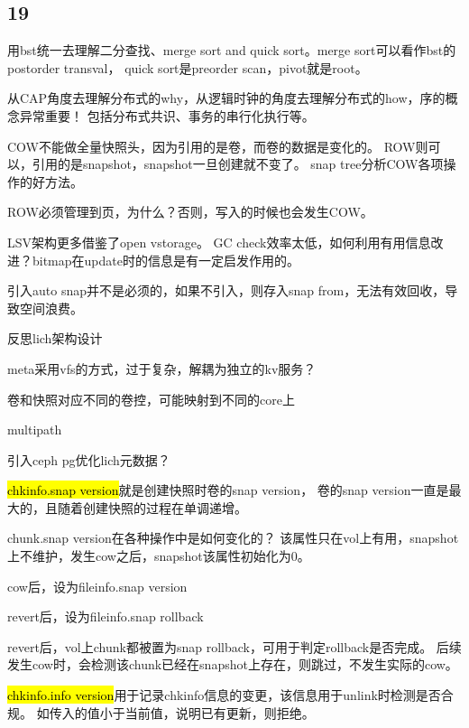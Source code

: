 \subsection{19}

用bst统一去理解二分查找、merge sort and quick sort。merge sort可以看作bst的postorder transval，
quick sort是preorder scan，pivot就是root。

从CAP角度去理解分布式的why，从逻辑时钟的角度去理解分布式的how，序的概念异常重要！
包括分布式共识、事务的串行化执行等。

\hrulefill

COW不能做全量快照头，因为引用的是卷，而卷的数据是变化的。
ROW则可以，引用的是snapshot，snapshot一旦创建就不变了。
snap tree分析COW各项操作的好方法。

ROW必须管理到页，为什么？否则，写入的时候也会发生COW。

LSV架构更多借鉴了open vstorage。
GC check效率太低，如何利用有用信息改进？bitmap在update时的信息是有一定启发作用的。

引入auto snap并不是必须的，如果不引入，则存入snap from，无法有效回收，导致空间浪费。

\hrulefill

反思lich架构设计
\begin{enumbox}
\item meta采用vfs的方式，过于复杂，解耦为独立的kv服务？
\item 卷和快照对应不同的卷控，可能映射到不同的core上
\item multipath
\item 引入ceph pg优化lich元数据？
\end{enumbox}

\hrulefill

\hl{chkinfo.snap version}就是创建快照时卷的snap version，
卷的snap version一直是最大的，且随着创建快照的过程在单调递增。

chunk.snap version在各种操作中是如何变化的？
该属性只在vol上有用，snapshot上不维护，发生cow之后，snapshot该属性初始化为0。
\begin{enumbox}
\item cow后，设为fileinfo.snap version
\item revert后，设为fileinfo.snap rollback
\end{enumbox}

revert后，vol上chunk都被置为snap rollback，可用于判定rollback是否完成。
后续发生cow时，会检测该chunk已经在snapshot上存在，则跳过，不发生实际的cow。

\hl{chkinfo.info version}用于记录chkinfo信息的变更，该信息用于unlink时检测是否合规。
如传入的值小于当前值，说明已有更新，则拒绝。

